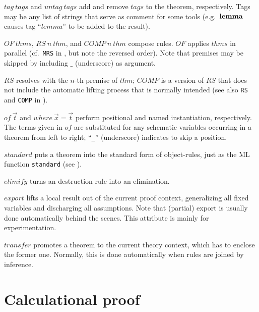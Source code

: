 \begin{descr}
\item [$tag~tags$ and $untag~tags$] add and remove $tags$ to the theorem,
  respectively.  Tags may be any list of strings that serve as comment for
  some tools (e.g.\ ${\mathord{\mathbf{lemma}}}$ causes tag ``$lemma$'' to be added to the
  result).
\item [$OF~thms$, $RS~n~thm$, and $COMP~n~thm$] compose rules.  $OF$ applies
  $thms$ in parallel (cf.\ \texttt{MRS} in \cite[\S5]{isabelle-ref}, but note
  the reversed order).  Note that premises may be skipped by including $\_$
  (underscore) as argument.
  
  $RS$ resolves with the $n$-th premise of $thm$; $COMP$ is a version of $RS$
  that does not include the automatic lifting process that is normally
  intended (see also \texttt{RS} and \texttt{COMP} in
  \cite[\S5]{isabelle-ref}).
  
\item [$of~\vec t$ and $where~\vec x = \vec t$] perform positional and named
  instantiation, respectively.  The terms given in $of$ are substituted for
  any schematic variables occurring in a theorem from left to right;
  ``\texttt{_}'' (underscore) indicates to skip a position.
 
\item [$standard$] puts a theorem into the standard form of object-rules, just
  as the ML function \texttt{standard} (see \cite[\S5]{isabelle-ref}).
  
\item [$elimify$] turns an destruction rule into an elimination.
  
\item [$export$] lifts a local result out of the current proof context,
  generalizing all fixed variables and discharging all assumptions.  Note that
  (partial) export is usually done automatically behind the scenes.  This
  attribute is mainly for experimentation.
  
\item [$transfer$] promotes a theorem to the current theory context, which has
  to enclose the former one.  Normally, this is done automatically when rules
  are joined by inference.

\end{descr}


\section{Calculational proof}\label{sec:calculation}

